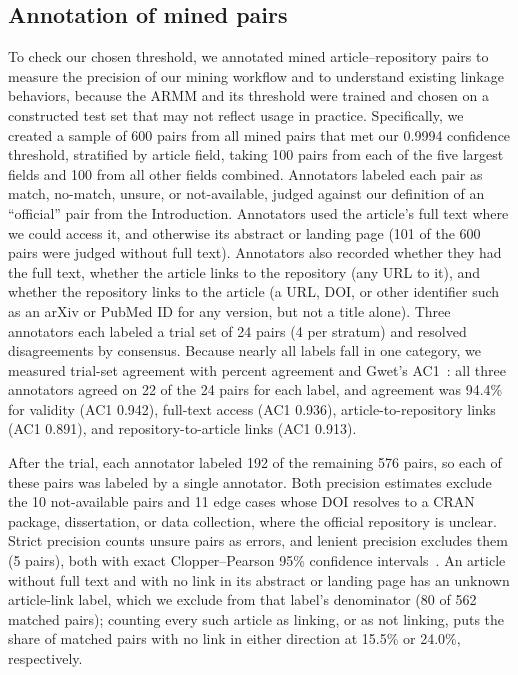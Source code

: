 \documentclass[pdflatex,sn-nature]{sn-jnl}%
\begin{document}
\subsection{Annotation of mined pairs}\label{subsec:m-annotation}

To check our chosen threshold, we annotated mined article--repository pairs to measure the precision of our mining workflow and to understand existing linkage behaviors, because the ARMM and its threshold were trained and chosen on a constructed test set that may not reflect usage in practice.
Specifically, we created a sample of 600 pairs from all mined pairs that met our 0.9994 confidence threshold, stratified by article field, taking 100 pairs from each of the five largest fields and 100 from all other fields combined.
Annotators labeled each pair as match, no-match, unsure, or not-available, judged against our definition of an ``official'' pair from the Introduction.
Annotators used the article's full text where we could access it, and otherwise its abstract or landing page (101 of the 600 pairs were judged without full text).
Annotators also recorded whether they had the full text, whether the article links to the repository (any URL to it), and whether the repository links to the article (a URL, DOI, or other identifier such as an arXiv or PubMed ID for any version, but not a title alone).
Three annotators each labeled a trial set of 24 pairs (4 per stratum) and resolved disagreements by consensus.
Because nearly all labels fall in one category, we measured trial-set agreement with percent agreement and Gwet's AC1~\cite{gwet2008computing}: all three annotators agreed on 22 of the 24 pairs for each label, and agreement was 94.4\% for validity (AC1 0.942), full-text access (AC1 0.936), article-to-repository links (AC1 0.891), and repository-to-article links (AC1 0.913).

After the trial, each annotator labeled 192 of the remaining 576 pairs, so each of these pairs was labeled by a single annotator.
Both precision estimates exclude the 10 not-available pairs and 11 edge cases whose DOI resolves to a CRAN package, dissertation, or data collection, where the official repository is unclear. Strict precision counts unsure pairs as errors, and lenient precision excludes them (5 pairs), both with exact Clopper--Pearson 95\% confidence intervals~\cite{clopper1934use}.
An article without full text and with no link in its abstract or landing page has an unknown article-link label, which we exclude from that label's denominator (80 of 562 matched pairs); counting every such article as linking, or as not linking, puts the share of matched pairs with no link in either direction at 15.5\% or 24.0\%, respectively.
\end{document}

